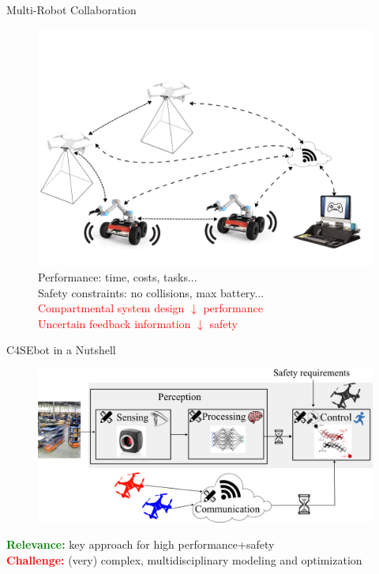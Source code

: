 \documentclass[10pt,xcolor={dvipsnames}]{beamer}
\newcommand{\red}[1]{\textcolor{red}{#1}}
\newcommand{\green}[1]{\textcolor{Green}{#1}}
\begin{document}
	\begin{frame}{Multi-Robot Collaboration}
		
		\begin{figure}
			\centering
			\includegraphics[width=.8\linewidth]{multi_robot_scheme}\\\vspace{2mm}
			Performance: time, costs, tasks...\\
			Safety constraints: no collisions, max battery...\vspace{1mm}\\
			\red{Compartmental system design $\downarrow$ performance}\\
			\red{Uncertain feedback information $\downarrow$ safety}
		\end{figure}
		
	\end{frame}
	
	\begin{frame}{C4SEbot in a Nutshell}
		
		\begin{figure}
			\centering
			\includegraphics[width=\linewidth]{scheme_robust_codesign_comm}
		\end{figure}
		
		\green{\textbf{Relevance:}} key approach for high performance+safety\\
		\red{\textbf{Challenge:}} (very) complex, multidisciplinary modeling and optimization
		
	\end{frame}
	
\end{document}
